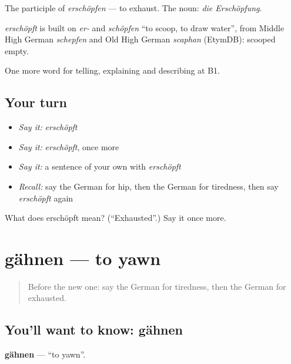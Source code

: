 The participle of \emph{erschöpfen} — to exhaust. The noun: \emph{die Erschöpfung}.

\begin{cousinweb}
\emph{erschöpft} is built on \emph{er-} and \emph{schöpfen} \textquotedblleft{}to scoop, to draw water\textquotedblright{}, from Middle High German \emph{schepfen} and Old High German \emph{scaphan} (EtymDB): scooped empty.
\end{cousinweb}

\begin{grammarlens}[title={What you've built}]
One more word for telling, explaining and describing at B1.
\end{grammarlens}

\subsection*{Your turn}
\begin{itemize}
\raggedright
  \item \emph{Say it:} \emph{erschöpft}
  \item \emph{Say it:} \emph{erschöpft}, once more
  \item \emph{Say it:} a sentence of your own with \emph{erschöpft}
  \item \emph{Recall:} say the German for hip, then the German for tiredness, then say \emph{erschöpft} again
\end{itemize}

\begin{tcolorbox}[breakable,colback=teal!4,colframe=teal!35!black,title={Before you move on}]
What does erschöpft mean? (\textquotedblleft{}Exhausted\textquotedblright{}.) Say it once more.
\end{tcolorbox}
\section[gähnen]{gähnen — to yawn}

\label{lesson:GE-C486-gaehnen}



\begin{quote}
Before the new one: say the German for tiredness, then the German for exhausted.
\end{quote}

\subsection*{You'll want to know: gähnen}
\textbf{gähnen} — \textquotedblleft{}to yawn\textquotedblright{}.

